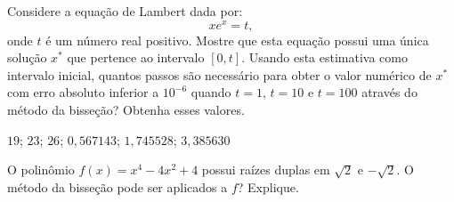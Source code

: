 \begin{Exercise} Considere a equação de Lambert dada por:
  \begin{equation*}
    xe^x= t,
  \end{equation*}
onde $t$ é um número real positivo. Mostre que esta equação possui uma única solução $x^*$ que pertence ao intervalo $[0, t]$. Usando esta estimativa como intervalo inicial, quantos passos são necessário para obter o valor numérico de $x^*$ com erro absoluto inferior a $10^{-6}$ quando $t=1$, $t=10$ e $t=100$ através do método da bisseção? Obtenha esses valores.
\end{Exercise}
\begin{Answer}
  \begin{tiny}
    $19$; $23$; $26$; $0,567143$; $1,745528$; $3,385630$
  \end{tiny}
\end{Answer}

\begin{Exercise}\label{prob_raiz_dupla} O polinômio $f(x)=x^4-4x^2+4$ possui raízes duplas em $\sqrt{2}$ e $-\sqrt{2}$. O método da bisseção pode ser aplicados a $f$? Explique.
\end{Exercise}

